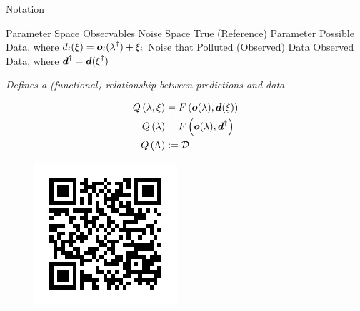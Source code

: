 \begin{block}{Notation}
\large
    \begin{itemize}
         Parameter Space
         Observables
         Noise Space
        \itembox{$\param^\dagger\in\pspace$} True (Reference) Parameter
         Possible Data, where $d_i(\operatorname*{\xi}) = \boldsymbol{o}_i(\operatorname*{\lambda}^\dagger) + \xi_i$
        \itembox{$\noise^\dagger\in\nspace$} Noise that Polluted (Observed) Data
         Observed Data, where $\boldsymbol{d}^\dagger = \boldsymbol{d}(\operatorname*{\xi}^\dagger)$
    \end{itemize}

\Large
    \emph{\Large Defines a (functional) relationship between predictions and data}

    \begin{equation}
        \begin{split}
        Q \left (\operatorname*{\lambda}, \operatorname*{\xi} \right ) &= F \left ( \boldsymbol{o}(\operatorname*{\lambda}), \boldsymbol{d}(\operatorname*{\xi}) \right ) \\
        Q \left (\operatorname*{\lambda} \right ) &= F \left ( \boldsymbol{o}(\operatorname*{\lambda}), \boldsymbol{d}^\dagger \right ) \\
        Q \left ( \Lambda \right ) &:= \mathcal{D}
        \end{split}
    \end{equation}

    \begin{figure}
        \includegraphics[width=0.75\linewidth]{ref1}
    \end{figure}

\end{block}


